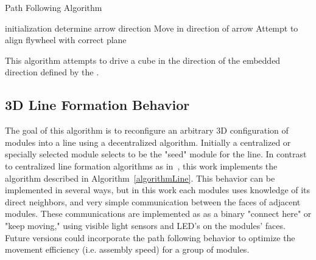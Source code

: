 \setcounter{algorithm}{-1}
\begin{algorithm}
	 
	\caption{Path Following Algorithm}
	\label{algorithmArrow}
	
	\SetAlgoLined
	initialization\;
	{
		determine arrow direction\;
		{
			Move in direction of arrow\;
		}
		{
			Attempt to align flywheel with correct plane\;
		}
	}
	\caption{This algorithm attempts to drive a cube in the direction of the embedded direction defined by the \tagNamePlural.}
\end{algorithm}

\subsection{3D Line Formation Behavior}
\label{ssec:algline}


The goal of this algorithm is to reconfigure an arbitrary 3D configuration of modules into a line using a decentralized algorithm. Initially a centralized or specially selected module selects to be the "seed" module for the line.  In contrast to centralized line formation algorithms as in~\cite{sung2015reconfiguration}, this work implements the algorithm described in Algorithm~\ref{algorithmLine}. This behavior can be implemented in several ways, but in this work each modules uses knowledge of its direct neighbors, and very simple communication between the faces of adjacent modules. These communications are implemented as as a binary "connect here" or "keep moving," using visible light sensors and LED's on the modules' faces. Future versions could  incorporate the path following behavior to optimize the movement efficiency (i.e. assembly speed) for a group of modules.

